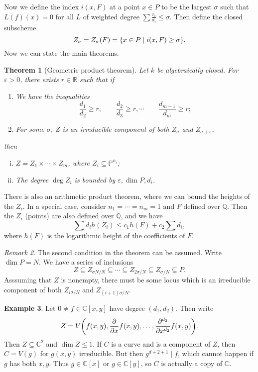 \documentclass[leqno, openany]{memoir}
\newtheorem{thm}{Theorem}[section]
\theoremstyle{definition}
\newtheorem{exm}[thm]{Example}
\theoremstyle{remark}
\newtheorem{rmk}[thm]{Remark}
\theoremstyle{plain}
\theoremstyle{definition}
\theoremstyle{remark}
\newcommand{\R}{\mathbb{R}}
\newcommand{\C}{\mathbb{C}}
\newcommand{\Q}{\mathbb{Q}}
\renewcommand{\P}{\mathbb{P}}
\newcommand{\ep}{\varepsilon}
\begin{document}
Now we define the index $i(x,F)$ at a point $x \in P$ to be the largest $\sigma$ such that $L(f)(x) = 0$ for all $L$ of weighted degree $\sum \frac{r_i}{d_i} \leq \sigma$. Then define the closed subscheme 
\[ Z_{\sigma} = Z_{\sigma}(F) = \qty{x \in P \mid i(x,F) \geq \sigma}. \]
Now we can state the main theorems.

\begin{thm}[Geometric product theorem]
    Let $k$ be algebraically closed. For $\ep > 0$, there exists $r \in \R$ such that if
    \begin{enumerate}[(1)]
        \item We have the inequalities
            \[ \frac{d_1}{d_2} \geq r, \qquad \frac{d_2}{d_3} \geq r, \cdots \qquad \frac{d_{m-1}}{d_m} \geq r; \]
        \item For some $\sigma$, $Z$ is an irreducible component of both $Z_{\sigma}$ and $Z_{\sigma + \ep}$,
    \end{enumerate}
    then
    \begin{enumerate}[(i)]
        \item $Z = Z_1 \times \cdots \times Z_m$, where $Z_i \subseteq \P^{n_i}$;
        \item The degree $\deg Z_i$ is bounded by $\ep, \dim P, d_i$.
    \end{enumerate}
\end{thm}

There is also an arithmetic product theorem, where we can bound the heights of the $Z_i$. In a special case, consider $n_1 = \cdots = n_m = 1$ and $F$ defined over $\Q$. Then the $Z_i$ (points) are also defined over $\Q$, and we have
\[ \sum d_i h(Z_i) \leq c_1 h(F) + c_2 \sum d_i, \]
where $h(F)$ is the logarithmic height of the coefficients of $F$.

\begin{rmk}
    The second condition in the theorem can be assumed. Write $\dim P = N$. We have a series of inclusions
    \[ Z \subseteq Z_{\sigma N/N} \subseteq \cdots \subseteq Z_{2\sigma/N} \subseteq Z_{\sigma/N} \subsetneq P. \]
    Asssuming that $Z$ is nonempty, there must be some locus which is an irreducible component of both $Z_{i\sigma/N}$ and $Z_{(i+1)\sigma/N}$.
\end{rmk}

\begin{exm}
    Let $0 \neq f \in \C[x,y]$ have degree $(d_1, d_2)$. Then write
    \[ Z = V\qty(f(x,y), \pdv{x} f(x,y), \ldots, \pdv[d_2]{x} f(x,y)). \]
    Then $Z \subseteq \C^2$ and $\dim Z \leq 1$. If $C$ is a curve and is a component of $Z$, then $C = V(g)$ for $g(x,y)$ irreducible. But then $g^{d+2 + 1} \mid f$, which cannot happen if $g$ has both $x,y$. Thus $g \in \C[x]$ or $g \in \C[y]$, so $C$ is actually a copy of $\C$.
\end{exm}
\end{document}
